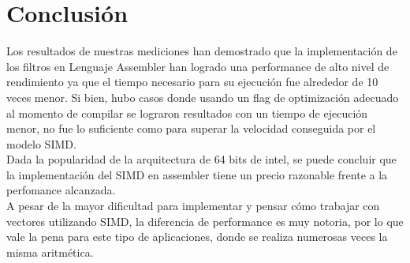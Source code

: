 \documentclass[10pt,a4paper,spanish]{article}
\begin{document}
\section{Conclusión}

Los resultados de nuestras mediciones han demostrado que la implementación de los filtros en Lenguaje Assembler han logrado una performance de alto nivel de rendimiento ya que el tiempo necesario para su ejecución fue alrededor de 10 veces menor. Si bien, hubo casos donde usando un flag de optimización adecuado al momento de compilar se lograron resultados con un tiempo de ejecución menor, no fue lo suficiente como para superar la velocidad conseguida por el modelo SIMD. \\

Dada la popularidad de la arquitectura de 64 bits de intel, se puede concluir que la implementación del SIMD en assembler tiene un precio razonable frente a la perfomance alcanzada.\\

A pesar de la mayor dificultad para implementar y pensar cómo trabajar con vectores utilizando SIMD, la diferencia de performance es muy notoria, por lo que vale la pena para este tipo de aplicaciones, donde se realiza numerosas veces la misma aritmética.





\end{document}
